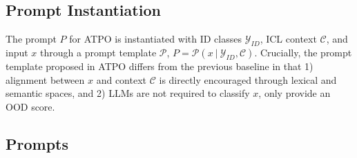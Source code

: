 
\subsection{Prompt Instantiation}
\label{sec:atpo_pinfo}

The prompt $P$ for ATPO is instantiated with ID classes $\mathcal{Y}_{ID}$, ICL context $\mathcal{C}$, and input $x$ through a prompt template $\mathcal{P}$, $P = \mathcal{P}(x\ |\ \mathcal{Y}_{ID},\mathcal{C})$. Crucially, the prompt template proposed in ATPO differs from the previous baseline in that 1) alignment between $x$ and context $\mathcal{C}$ is directly encouraged through lexical and semantic spaces, and 2) LLMs are not required to classify $x$, only provide an OOD score.

\subsection{Prompts}
\label{sec:app-prompts}


